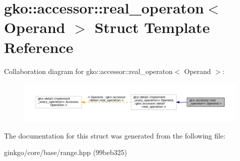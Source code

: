 \hypertarget{structgko_1_1accessor_1_1real__operaton}{}\section{gko\+:\+:accessor\+:\+:real\+\_\+operaton$<$ Operand $>$ Struct Template Reference}
\label{structgko_1_1accessor_1_1real__operaton}


Collaboration diagram for gko\+:\+:accessor\+:\+:real\+\_\+operaton$<$ Operand $>$\+:
\nopagebreak
\begin{figure}[H]
\begin{center}
\leavevmode
\includegraphics[width=350pt]{structgko_1_1accessor_1_1real__operaton__coll__graph}
\end{center}
\end{figure}


The documentation for this struct was generated from the following file\+:\begin{DoxyCompactItemize}
\item 
ginkgo/core/base/range.\+hpp (99beb325)\end{DoxyCompactItemize}
